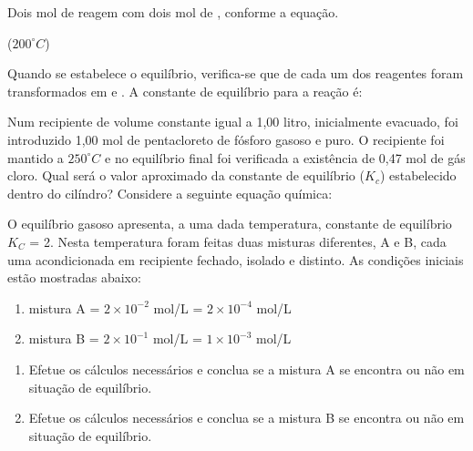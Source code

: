 \documentclass[a4paper,12]{exam}
\begin{document}
\begin{multicols}{2}
\begin{questions}
				\question Dois mol de  reagem com dois mol de , conforme a equação.
				\begin{center}
					 ($200^{\circ}C$)
				\end{center}
				Quando se estabelece o equilíbrio, verifica-se que  de cada um dos reagentes foram transformados em  e . A constante de equilíbrio para a reação é:
				\makeemptybox{2cm}

				\question Num recipiente de volume constante igual a 1,00 litro, inicialmente evacuado, foi introduzido 1,00 mol de pentacloreto de fósforo gasoso e puro. O recipiente foi mantido a $250^{\circ}C$ e no equilíbrio final foi verificada a existência de 0,47 mol de gás cloro. Qual será o valor aproximado da constante de equilíbrio ($K_c$) estabelecido dentro do cilíndro? Considere a seguinte equação química:
				\begin{center}
				\end{center}
				\makeemptybox{2cm}


				\question O equilíbrio gasoso  apresenta, a uma dada temperatura, constante de equilíbrio $K_C$ = 2. Nesta temperatura foram feitas duas misturas diferentes, A e B, cada uma acondicionada em recipiente fechado, isolado e distinto. As condições iniciais estão mostradas abaixo:
				\begin{enumerate}
				\item mistura A  = $2\times 10^{-2}$ mol/L  = $2\times 10^{-4}$ mol/L
				\item mistura B  = $2\times 10^{-1}$ mol/L  = $1\times 10^{-3}$ mol/L
					\end{enumerate}
				\begin{enumerate}[label=\alph*.]
					\item Efetue os cálculos necessários e conclua se a mistura A se encontra ou não em situação de equilíbrio.
					\item Efetue os cálculos necessários e conclua se a mistura B se encontra ou não em situação de equilíbrio.
				\end{enumerate}


	\end{questions}
\end{multicols}
\end{document}
